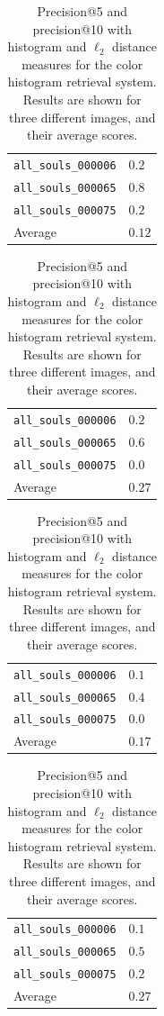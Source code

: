 \documentclass[a4paper,10pt,twoside]{article}
\begin{document}
\begin{table}
  \begin{subtable}{0.47\textwidth}
    \begin{tabular}{l|l}
      \texttt{all\_souls\_000006} & $0.2$ \\
      \texttt{all\_souls\_000065} & $0.8$ \\
      \texttt{all\_souls\_000075} & $0.2$ \\
      \hline
      Average                     & $0.12$ \\
    \end{tabular}
    \caption{Precision@5, histogram distance.}
    \label{tab:color_p5h}
  \end{subtable}
  \hspace*{\fill}
  \begin{subtable}{0.47\textwidth}
    \begin{tabular}{l|l}
      \texttt{all\_souls\_000006} & $0.2$ \\
      \texttt{all\_souls\_000065} & $0.6$ \\
      \texttt{all\_souls\_000075} & $0.0$ \\
      \hline
      Average                     & $0.27$ \\
    \end{tabular}
    \caption{Precision@5, $\ell_2$ distance.}
    \label{tab:color_p5l}
  \end{subtable}
  \begin{subtable}{0.47\textwidth}
    \begin{tabular}{l|l}
      \texttt{all\_souls\_000006} & $0.1$ \\
      \texttt{all\_souls\_000065} & $0.4$ \\
      \texttt{all\_souls\_000075} & $0.0$ \\
      \hline
      Average                     & $0.17$ \\
    \end{tabular}
    \caption{Precision@10, histogram distance.}
    \label{tab:color_p10h}
  \end{subtable}
  \hspace*{\fill}
  \begin{subtable}{0.47\textwidth}
    \begin{tabular}{l|l}
      \texttt{all\_souls\_000006} & $0.1$ \\
      \texttt{all\_souls\_000065} & $0.5$ \\
      \texttt{all\_souls\_000075} & $0.2$ \\
      \hline
      Average                     & $0.27$ \\
    \end{tabular}
    \caption{Precision@10, $\ell_2$ distance.}
    \label{tab:color_p10l}
  \end{subtable}
  \caption{Precision@5 and precision@10 with histogram and $\ell_2$ distance measures for the color histogram retrieval system.  Results are shown for three different images, and their average scores.}
  \label{tab:color_precision}
\end{table}



\end{document}
